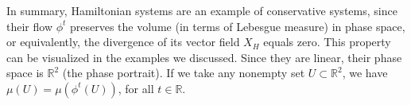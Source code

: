 \documentclass[a4paper,12pt] {article}
\begin{document}
 In summary, Hamiltonian systems are an example of conservative systems, since their flow $\phi^t$ preserves the volume (in terms of Lebesgue measure) in phase space, or equivalently, the divergence of its vector field $X_H$ equals zero. This property can be visualized in the examples we discussed. Since they are linear, their phase space is $\mathbb{R}^2$ (the phase portrait). If we take any nonempty set $U \subset \mathbb{R}^2$, we have $\mu(U) = \mu(\phi^t(U))$, for all $t \in \mathbb{R}$.



\end{document}
